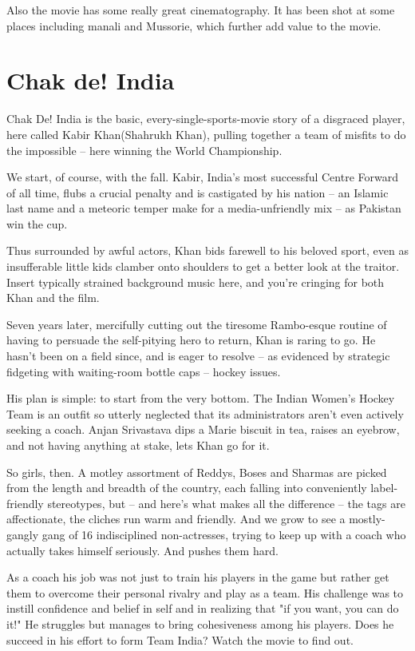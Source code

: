 \documentclass[11pt]{article} %
\begin{document}
Also the movie has some really great cinematography. It has been shot at some places including manali and Mussorie, which further add value to the movie.

\section{Chak de! India}
Chak De! India is the basic, every-single-sports-movie story of a disgraced player, here called Kabir Khan(Shahrukh Khan), pulling together a team of misfits to do the impossible -- here winning the World Championship. 

We start, of course, with the fall. Kabir, India's most successful Centre Forward of all time, flubs a crucial penalty and is castigated by his nation -- an Islamic last name and a meteoric temper make for a media-unfriendly mix -- as Pakistan win the cup.

Thus surrounded by awful actors, Khan bids farewell to his beloved sport, even as insufferable little kids clamber onto shoulders to get a better look at the traitor. Insert typically strained background music here, and you're cringing for both Khan and the film.

Seven years later, mercifully cutting out the tiresome Rambo-esque routine of having to persuade the self-pitying hero to return, Khan is raring to go. He hasn't been on a field since, and is eager to resolve -- as evidenced by strategic fidgeting with waiting-room bottle caps -- hockey issues.

His plan is simple: to start from the very bottom. The Indian Women's Hockey Team is an outfit so utterly neglected that its administrators aren't even actively seeking a coach. Anjan Srivastava dips a Marie biscuit in tea, raises an eyebrow, and not having anything at stake, lets Khan go for it.

So girls, then. A motley assortment of Reddys, Boses and Sharmas are picked from the length and breadth of the country, each falling into conveniently label-friendly stereotypes, but -- and here's what makes all the difference -- the tags are affectionate, the cliches run warm and friendly. And we grow to see a mostly-gangly gang of 16 indisciplined non-actresses, trying to keep up with a coach who actually takes himself seriously. And pushes them hard.

As a coach his job was not just to train his players in the game but rather get them to overcome their personal rivalry and play as a team. His challenge was to instill confidence and belief in self and in realizing that "if you want, you can do it!" He struggles but manages to bring cohesiveness among his players. Does he succeed in his effort to form Team India? Watch the movie to find out.
\end{document}
